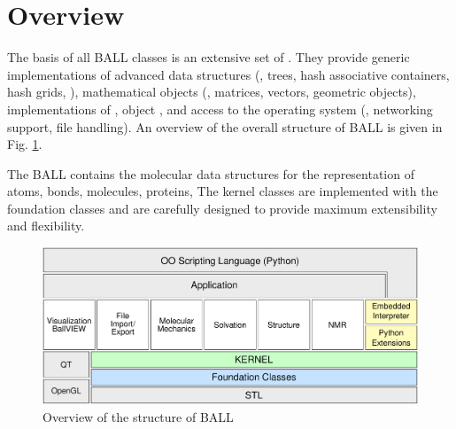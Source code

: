 \section{Overview}

The basis of all BALL classes is an extensive set of .  They provide generic implementations of advanced data structures
(\eg, trees, hash associative containers, hash grids, \etc), mathematical
objects (\eg, matrices, vectors, geometric objects), implementations of
, object , and access to the
operating system (\eg, networking support, file handling). An overview of the
overall structure of BALL is given in Fig. \ref{fig:BALL_structure}.

The BALL  contains the molecular data structures for the
representation of atoms, bonds, molecules, proteins, \etc  The kernel classes
are implemented with the foundation classes and are carefully designed to
provide maximum extensibility and flexibility.
\begin{figure}[tb]
  \centering\includegraphics[width=\textwidth]{BALL_structure}
  \caption{Overview of the structure of BALL}
  \label{fig:BALL_structure}
\end{figure}

